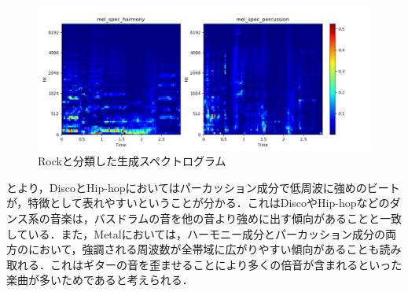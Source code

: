 \begin{figure}[htbp]
	\begin{center}
		\includegraphics[scale=0.51]{./images/generate-model/gen-rock.png}
		\caption{Rockと分類した生成スペクトログラム}
		\label{fig:generate-rock}
	\end{center}
\end{figure}

\newpage
{}とより，DiscoとHip-hopにおいてはパーカッション成分で低周波に強めのビートが，特徴として表れやすいということが分かる．これはDiscoやHip-hopなどのダンス系の音楽は，バスドラムの音を他の音より強めに出す傾向があることと一致している．また，Metalにおいては，ハーモニー成分とパーカッション成分の両方のにおいて，強調される周波数が全帯域に広がりやすい傾向があることも読み取れる．これはギターの音を歪ませることにより多くの倍音が含まれるといった楽曲が多いためであると考えられる．

